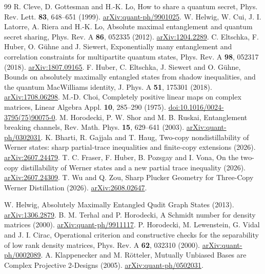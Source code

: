 \documentclass[11pt,a4paper]{article}
\begin{document}
\begingroup\small
\begin{thebibliography}{99}
 R. Cleve, D. Gottesman and H.-K. Lo,
How to share a quantum secret,
Phys. Rev. Lett. \textbf{83}, 648--651 (1999).
\href{https://arxiv.org/abs/quant-ph/9901025}{arXiv:quant-ph/9901025}.
 W. Helwig, W. Cui, J. I. Latorre, A. Riera and H.-K. Lo,
Absolute maximal entanglement and quantum secret sharing,
Phys. Rev. A \textbf{86}, 052335 (2012).
\href{https://arxiv.org/abs/1204.2289}{arXiv:1204.2289}.
 C. Eltschka, F. Huber, O. G\"uhne and J. Siewert,
Exponentially many entanglement and correlation constraints for multipartite quantum states,
Phys. Rev. A \textbf{98}, 052317 (2018).
\href{https://arxiv.org/abs/1807.09165}{arXiv:1807.09165}.
 F. Huber, C. Eltschka, J. Siewert and O. G\"uhne,
Bounds on absolutely maximally entangled states from shadow inequalities, and the quantum MacWilliams identity,
J. Phys. A \textbf{51}, 175301 (2018).
\href{https://arxiv.org/abs/1708.06298}{arXiv:1708.06298}.
 M.-D. Choi,
Completely positive linear maps on complex matrices,
Linear Algebra Appl. \textbf{10}, 285--290 (1975).
\href{https://doi.org/10.1016/0024-3795(75)90075-0}{doi:10.1016/0024-3795(75)90075-0}.
 M. Horodecki, P. W. Shor and M. B. Ruskai,
Entanglement breaking channels,
Rev. Math. Phys. \textbf{15}, 629--641 (2003).
\href{https://arxiv.org/abs/quant-ph/0302031}{arXiv:quant-ph/0302031}.
 K. Bharti, R. Gajjala and T. Haug,
Two-copy nondistillability of Werner states: sharp partial-trace inequalities and finite-copy extensions (2026).
\href{https://arxiv.org/abs/2607.24479}{arXiv:2607.24479}.
 T. C. Fraser, F. Huber, B. Pozsgay and I. Vona,
On the two-copy distillability of Werner states and a new partial trace inequality (2026).
\href{https://arxiv.org/abs/2607.24309}{arXiv:2607.24309}.
 T. Wu and Q. Zou,
Sharp Plucker Geometry for Three-Copy Werner Distillation (2026).
\href{https://arxiv.org/abs/2608.02647}{arXiv:2608.02647}.

 W. Helwig, Absolutely Maximally Entangled Qudit Graph States (2013).
\href{https://arxiv.org/abs/1306.2879}{arXiv:1306.2879}.
 B. M. Terhal and P. Horodecki, A Schmidt number for density matrices (2000).
\href{https://arxiv.org/abs/quant-ph/9911117}{arXiv:quant-ph/9911117}.
 P. Horodecki, M. Lewenstein, G. Vidal and J. I. Cirac,
Operational criterion and constructive checks for the separability of low rank density matrices,
Phys. Rev. A \textbf{62}, 032310 (2000).
\href{https://arxiv.org/abs/quant-ph/0002089}{arXiv:quant-ph/0002089}.
 A. Klappenecker and M. R\"otteler,
Mutually Unbiased Bases are Complex Projective 2-Designs (2005).
\href{https://arxiv.org/abs/quant-ph/0502031}{arXiv:quant-ph/0502031}.
\end{thebibliography}
\endgroup
\end{document}
